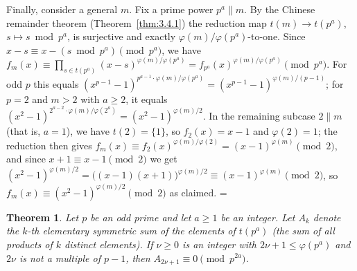 \documentclass[11pt]{article}
\makeatletter
\theoremstyle{ntstyle}
\newtheorem{theorem}{Theorem}[subsection]
\let\nt@closedisplay\]
\def\nt@guardedclose{\@ifnextchar\par{\nt@closeafterpar}{\@ifnextchar\end{\postdisplaypenalty\@M\nt@closedisplay}{\nt@closedisplay}}}
\def\nt@closeafterpar\par{\@ifnextchar\par{\nt@closeafterpar}{\@ifnextchar\end{\postdisplaypenalty\@M\nt@closedisplay\par}{\nt@closedisplay\par}}}
\renewenvironment{proof}[1][\proofname]{\par
  \pushQED{\qed}\normalfont\topsep\medskipamount\edef\nt@afterproof{\@endparpenalty=\the\@endparpenalty\relax}\@beginparpenalty\@M\@endparpenalty\@M\let\]\nt@guardedclose\trivlist\item[]\textit{#1\@addpunct{.}} \ignorespaces}{\ifvmode\addpenalty\@M\fi\popQED\nt@afterproof\endtrivlist\@endpefalse}
\makeatother
\begin{document}
\begin{proof}
	Finally, consider a general $m$. Fix a prime power $p^{a} \parallel m$.
	By the Chinese remainder theorem (Theorem~\ref{thm:3.4.1}) the reduction map $t(m) \to t(p^{a})$, $s \mapsto s \bmod
		p^{a}$, is surjective and exactly $\varphi(m)/\varphi(p^{a})$-to-one.
	Since $x - s \equiv x - (s \bmod p^{a}) \pmod{p^{a}}$, we have $f_m(x) \equiv
		\prod_{s \in t(p^{a})}(x - s)^{\varphi(m)/\varphi(p^{a})} =
		f_{p^{a}}(x)^{\varphi(m)/\varphi(p^{a})} \pmod{p^{a}}$. For odd $p$
	this equals $(x^{p-1}-1)^{p^{a-1}\cdot \varphi(m)/\varphi(p^{a})} =
		(x^{p-1}-1)^{\varphi(m)/(p-1)}$; for $p = 2$ and $m > 2$ with $a \ge 2$, it equals
	$(x^{2}-1)^{2^{a-2}\cdot\varphi(m)/\varphi(2^{a})} =
		(x^{2}-1)^{\varphi(m)/2}$. In the remaining subcase
	$2 \parallel m$ (that is, $a = 1$), we have $t(2) = \{1\}$, so
	$f_{2}(x) = x - 1$ and $\varphi(2) = 1$; the reduction then gives
	$f_m(x) \equiv f_{2}(x)^{\varphi(m)/\varphi(2)} = (x-1)^{\varphi(m)}
		\pmod{2}$, and since $x + 1 \equiv x - 1 \pmod{2}$ we get
	$(x^{2}-1)^{\varphi(m)/2} = \big((x-1)(x+1)\big)^{\varphi(m)/2} \equiv
		(x-1)^{\varphi(m)} \pmod{2}$, so $f_m(x) \equiv (x^{2}-1)^{\varphi(m)/2}
		\pmod{2}$ as claimed.
\end{proof}
\begin{theorem}\label{thm:6.9.2} Let $p$ be an odd prime and let $a\ge1$ be an integer. Let $A_{k}$
	denote the $k$-th elementary symmetric sum of the elements of
	$t(p^{a})$ (the sum of all products of $k$ distinct elements). If $\nu\ge0$ is an integer with
	$2\nu+1\le\varphi(p^{a})$ and $2\nu$ is not a multiple of $p-1$, then $A_{2\nu+1} \equiv 0
	\pmod{p^{2a}}$.
\end{theorem}
\end{document}
